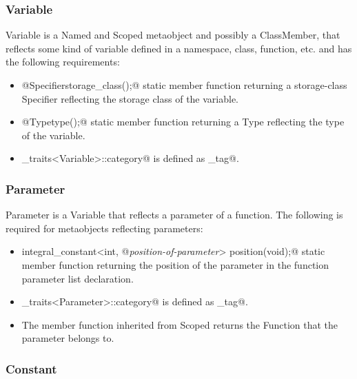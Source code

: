 \subsubsection{Variable}

{\metaobject Variable} is a {\metaobject Named} and {\metaobject Scoped} metaobject and possibly a
{\metaobject ClassMember}, that reflects some kind of variable defined in a namespace, class, function, etc.
and has the following requirements:

\begin{itemize}
	\item{\verb@static @{\metaobject Specifier}\verb@ storage_class();@} static member function returning
	a storage-class {\metaobject Specifier} reflecting the storage class of the variable.

	\item{\verb@static @{\metaobject Type}\verb@ type();@} static member function returning
	a {\metaobject Type} reflecting the type of the variable.

	\item \verb@metaobject_traits<Variable>::category@ is defined as \verb@variable_tag@.
\end{itemize}

\subsubsection{Parameter}

{\metaobject Parameter} is a {\metaobject Variable} that reflects a parameter of a function.
The following is required for metaobjects reflecting parameters:

\begin{itemize}
	\item{\verb@static integral_constant<int, @{\em position-of-parameter}\verb@> position(void);@}
	static member function returning the position of the parameter in the function parameter list
	declaration.

	\item \verb@metaobject_traits<Parameter>::category@ is defined as \verb@parameter_tag@.

	\item The \verb@scope@ member function inherited from {\metaobject Scoped} returns
	the {\metaobject Function} that the parameter belongs to.
\end{itemize}

\subsubsection{Constant}

